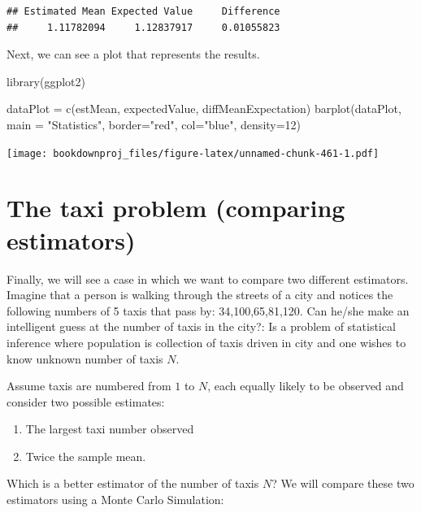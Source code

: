 \documentclass[
]{book}
\newenvironment{Shaded}{\begin{snugshade}}{\end{snugshade}}
\newcommand{\AttributeTok}[1]{\textcolor[rgb]{0.77,0.63,0.00}{#1}}
\newcommand{\DecValTok}[1]{\textcolor[rgb]{0.00,0.00,0.81}{#1}}
\newcommand{\FunctionTok}[1]{\textcolor[rgb]{0.00,0.00,0.00}{#1}}
\newcommand{\NormalTok}[1]{#1}
\newcommand{\OtherTok}[1]{\textcolor[rgb]{0.56,0.35,0.01}{#1}}
\newcommand{\StringTok}[1]{\textcolor[rgb]{0.31,0.60,0.02}{#1}}
\providecommand{\tightlist}{%
  \setlength{\itemsep}{0pt}\setlength{\parskip}{0pt}}
\begin{document}
\begin{verbatim}
## Estimated Mean Expected Value     Difference 
##     1.11782094     1.12837917     0.01055823
\end{verbatim}

Next, we can see a plot that represents the results.

\begin{Shaded}
\begin{Highlighting}[]
\FunctionTok{library}\NormalTok{(ggplot2)}

\NormalTok{dataPlot }\OtherTok{=} \FunctionTok{c}\NormalTok{(estMean, expectedValue, diffMeanExpectation)}
\FunctionTok{barplot}\NormalTok{(dataPlot, }\AttributeTok{main =} \StringTok{"Statistics"}\NormalTok{, }\AttributeTok{border=}\StringTok{"red"}\NormalTok{, }\AttributeTok{col=}\StringTok{"blue"}\NormalTok{, }\AttributeTok{density=}\DecValTok{12}\NormalTok{)}
\end{Highlighting}
\end{Shaded}

\texttt{[image: bookdownproj\_files/figure-latex/unnamed-chunk-461-1.pdf]}

\hypertarget{the-taxi-problem-comparing-estimators}{%
\section{The taxi problem (comparing estimators)}\label{the-taxi-problem-comparing-estimators}}

Finally, we will see a case in which we want to compare two different estimators. Imagine that a person is walking through the streets of a city and notices the following numbers of 5 taxis that pass by: 34,100,65,81,120. Can he/she make an intelligent guess at the number of taxis in the city?: Is a problem of statistical inference where population is collection of taxis driven in city and one wishes to know unknown number of taxis \(N\).

Assume taxis are numbered from \(1\) to \(N\), each equally likely to be observed and consider two possible estimates:

\begin{enumerate}
\def\labelenumi{\arabic{enumi}.}
\tightlist
\item
  The largest taxi number observed
\item
  Twice the sample mean.
\end{enumerate}

Which is a better estimator of the number of taxis \(N\)? We will compare these two estimators using a Monte Carlo Simulation:
\end{document}
